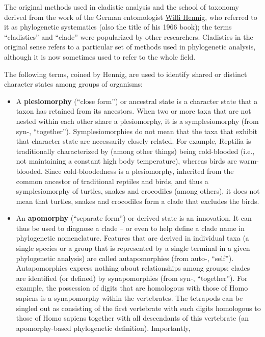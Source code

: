 The original methods used in cladistic analysis and the school of
taxonomy derived from the work of the German entomologist \href{https://en.wikipedia.org/wiki/Willi_Hennig}{Willi Hennig},
who referred to it as phylogenetic systematics (also the title of his
1966 book); the terms ``cladistics'' and ``clade'' were popularized by
other researchers. Cladistics in the original sense refers to a
particular set of methods used in phylogenetic analysis, although it is
now sometimes used to refer to the whole field.

The following terms, coined by Hennig, are used to identify shared or
distinct character states among groups of organisms:

\begin{itemize}
\item
  A \textbf{plesiomorphy} (``close form'') or ancestral state is a
  character state that a taxon has retained from its ancestors. When two
  or more taxa that are not nested within each other share a
  plesiomorphy, it is a symplesiomorphy (from syn-, ``together'').
  Symplesiomorphies do not mean that the taxa that exhibit that
  character state are necessarily closely related. For example, Reptilia
  is traditionally characterized by (among other things) being
  cold-blooded (i.e., not maintaining a constant high body temperature),
  whereas birds are warm-blooded. Since cold-bloodedness is a
  plesiomorphy, inherited from the common ancestor of traditional
  reptiles and birds, and thus a symplesiomorphy of turtles, snakes and
  crocodiles (among others), it does not mean that turtles, snakes and
  crocodiles form a clade that excludes the birds.
\item
  An \textbf{apomorphy} (``separate form'') or derived state is an
  innovation. It can thus be used to diagnose a clade -- or even to help
  define a clade name in phylogenetic nomenclature. Features that are
  derived in individual taxa (a single species or a group that is
  represented by a single terminal in a given phylogenetic analysis) are
  called autapomorphies (from auto-, ``self''). Autapomorphies express
  nothing about relationships among groups; clades are identified (or
  defined) by synapomorphies (from syn-, ``together''). For example, the
  possession of digits that are homologous with those of Homo sapiens is
  a synapomorphy within the vertebrates. The tetrapods can be singled
  out as consisting of the first vertebrate with such digits homologous
  to those of Homo sapiens together with all descendants of this
  vertebrate (an apomorphy-based phylogenetic definition). Importantly,

\end{itemize}

